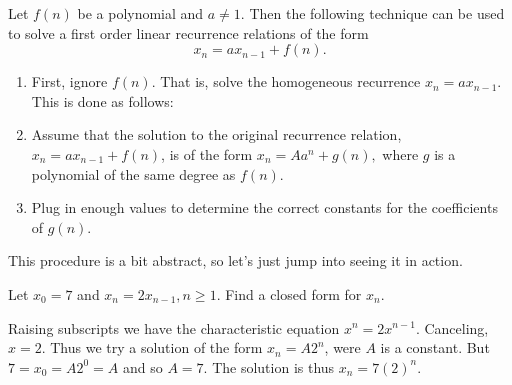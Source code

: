 \begin{proc}
Let $f(n)$ be a polynomial and $a\neq 1$.  Then the following 
technique can be used to solve a first order linear recurrence
relations of the form
$$x_n = ax_{n - 1} + f(n).$$
\begin{enumerate}
\item First, ignore $f(n)$.  That is, solve the homogeneous recurrence $x_n = ax_{n - 1}$.
This is done as follows:
\item
Assume that the solution to the original recurrence relation, 
$x_n = ax_{n - 1} + f(n)$, is of the form $x_n = Aa^n + g(n),$ 
where $g$ is a polynomial of the same degree as $f(n)$.
\item
Plug in enough values to determine the correct constants for the coefficients of $g(n)$.
\end{enumerate}
\end{proc}

This procedure is a bit abstract, so let's just jump into seeing it in action.

\begin{exa} 
Let $x_0 = 7$ and $x_n = 2x_{n - 1}, n \geq 1.$ Find a closed form for $x_n.$
\begin{sol} 
Raising subscripts we have the characteristic equation
$x^n = 2x^{n - 1}$. Canceling, $x = 2$. Thus we try a solution of
the form $x_n = A2^n$, were $A$ is a constant. But $7 = x_0 =
A2^0=A$ and so $A = 7.$
The solution is thus $x_n = 7(2)^n$.
\end{sol}
\end{exa}

